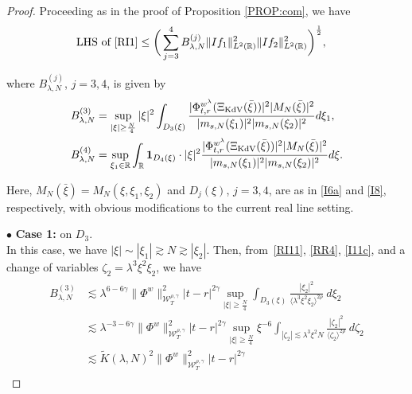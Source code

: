 \documentclass[letterpaper, 11pt,  reqno]{amsart}
\newcommand{\1}{\hspace{0.5mm}\text{I}\hspace{0.5mm}}
\newcommand{\noi}{\noindent}
\newcommand{\R}{\mathbb{R}}
\newcommand{\g}{\gamma}
\newcommand{\ld}{\lambda}
\newcommand{\wt}{\widetilde}
\newcommand{\les}{\lesssim}
\newcommand{\ges}{\gtrsim}
\newcommand{\jb}[1]
{\langle #1 \rangle}
\newcommand{\ind}{\mathbf 1}
\newcommand{\W}{\mathcal{W}}
\newcommand{\z}{\zeta}
\newcommand{\KDV}{\text{\rm KdV} }
\numberwithin{equation}{section}
\numberwithin{theorem}{section}
\begin{document}
\begin{proof}










Proceeding as in 
the proof of Proposition \ref{PROP:com}, 
we have 
\begin{align*}
\text{LHS of \eqref{RI1}}
&\leq \bigg(\sum_{j = 3}^4 
B_{\ld, N}^{(j)} \| I  f_1 \|_{L^2(\R)}^2 \| I  f_2 \|_{L^2(\R)}^2\bigg)^\frac 12 , 
\end{align*}

\noi
where $B_{\ld, N}^{(j)}$, $j =  3, 4$, is given by 
\begin{align}
B_{\ld, N}^{(3)}
& =
\sup_{|\xi|\geq \frac N4} |\xi|^2
\int_{D_3(\xi)}
 \frac{|\Phi^{w^\ld}_{t,r}(\Xi_\KDV(\bar \xi)) |^2  |M_N(\bar \xi)|^2 }{ |m_{s, N}(\xi_1)|^2|m_{s, N}(\xi_2)|^2}
 d\xi_1,
\label{RI11}\\
B_{\ld, N}^{(4)}
& =
\sup_{\xi_1 \in \R}
\int_\R
\ind_{D_4(\xi)}\cdot |\xi|^2 
\frac{ |\Phi^{w^\ld}_{t,r}(\Xi_\KDV(\bar \xi))|^2 |M_N(\bar \xi)|^2}{|m_{s, N}(\xi_1)|^2 |m_{s, N}(\xi_2)|^2}
d\xi.
\label{RI11a}
\end{align}

\noi
Here, 
$M_N(\bar \xi) = M_N(\xi, \xi_1, \xi_2)$
and $D_j(\xi)$, $j =  3, 4$, 
are 
as in \eqref{I6a} and \eqref{I8}, respectively, 
with obvious modifications
to the current real line setting.








\medskip

\noi
$\bullet$ \textbf{Case 1:} on  $D_3$.\\
\indent
In this case, we have $|\xi|\sim |\xi_1|\ges N \ges |\xi_2|$.
Then, from~\eqref{RI11},  \eqref{RR4}, 
 \eqref{I11c}, 
and
a change of variables $\z_2 = \ld^3 \xi^2 \xi_2$, we have 
\begin{align}
\begin{split}
B_{\ld, N}^{(3)}
&  \les 
\ld^{6- 6\g}
  \|\Phi^{w} \|^2_{\W^{\rho,\g}_T} |t-r|^{2\g}
\sup_{|\xi|\geq \frac N4}
\int_{D_3(\xi)} \frac{|\xi_2|^2}{
\jb{\ld^3 \xi^2 \xi_2}^{2\rho}}\
d\xi_2\\
&  \les 
\ld^{-3- 6\g}
  \|\Phi^{w} \|^2_{\W^{\rho,\g}_T} |t-r|^{2\g}
\sup_{|\xi|\geq \frac N4}\xi^{-6}
\int_{|\z_2|\les \ld^3 \xi^2 N} \frac{|\z_2|^2}{
\jb{\z_2}^{2\rho}}\
d\z_2\\
 &\les 
\wt K(\ld, N)^2
 \| \Phi^{w} \|^2_{\W_{T}^{\rho, \g}}  
|t-r|^{2\g}
\end{split}
\label{RI12}
 \end{align}
 

\end{proof}
\end{document}
